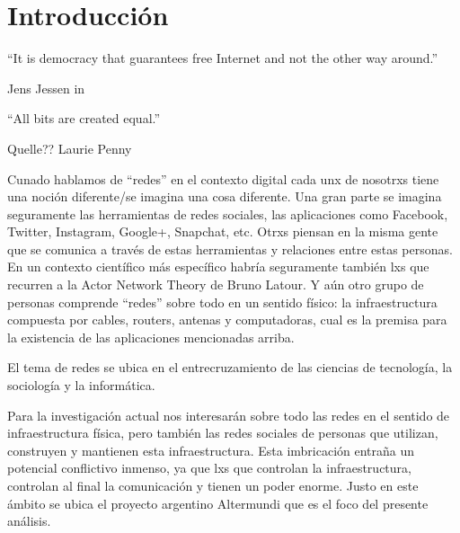 \section{Introducción}

\epigraph{``It is democracy that guarantees free Internet and not the other way around.''}{Jens Jessen in~\autocite{Rieder2012}}
\epigraph{``All bits are created equal.''}{Quelle?? Laurie Penny~\autocite[69]{Penny2014}}


Cunado hablamos de ``redes'' en el contexto digital cada unx de nosotrxs tiene una noción diferente/se imagina una cosa diferente.
Una gran parte se imagina seguramente las herramientas de redes sociales, las aplicaciones como Facebook, Twitter, Instagram, Google+, Snapchat, etc.
Otrxs piensan en la misma gente que se comunica a través de estas herramientas y relaciones entre estas personas.
En un contexto científico más específico habría seguramente también lxs que recurren a la Actor Network Theory de Bruno Latour.
Y aún otro grupo de personas comprende ``redes'' sobre todo en un sentido físico: la infraestructura compuesta por cables, routers, antenas y computadoras, cual es la premisa para la existencia de las aplicaciones mencionadas arriba.


El tema de redes se ubica en el entrecruzamiento de las ciencias de tecnología, la sociología y la informática.

\begin{comment}
por qué es importante/interesante?
	\item Erläutern Sie kurz, in welchem Themenbereich Ihre Arbeit angesiedelt ist. Wo werden Sie einen Beitrag leisten?
	\item Das Ziel sollte es sein, den groben Kontext Ihrer Arbeit darzustellen.

Política digital <-- Gabriella Coleman heranziehen
\end{comment}



Para la investigación actual nos interesarán sobre todo las redes en el sentido de infraestructura física, pero también las redes sociales de personas que utilizan, construyen y mantienen esta infraestructura.
Esta imbricación entraña un potencial conflictivo inmenso, ya que lxs que controlan la infraestructura, controlan al final la comunicación y tienen un poder enorme.
Justo en este ámbito se ubica el proyecto argentino Altermundi que es el foco del presente análisis.


